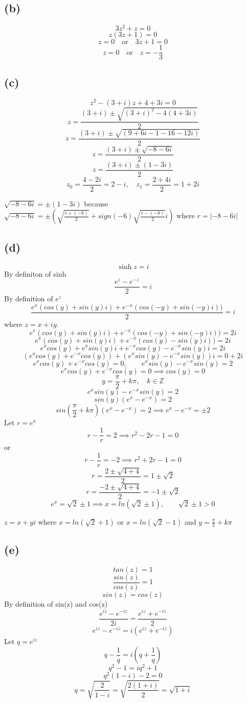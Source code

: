 \documentclass{article}
\begin{document}
\subsection*{(b)}
\[
   3z^2 + z = 0
\]
\[
   z(3z + 1) = 0
\]
\[
   z = 0 \quad \text{or} \quad 3z + 1 = 0
\]
\[
   z = 0 \quad \text{or} \quad z = -\frac{1}{3}
\]

\subsection*{(c)}
\[
   z^2 - (3 + i)z + 4 + 3i = 0
\]
\[
   z = \frac{(3 + i) \pm \sqrt{(3 + i)^2 - 4(4 + 3i)}}{2}
\]
\[
   z = \frac{(3 + i) \pm \sqrt{(9 + 6i - 1 - 16 - 12i)}}{2}
\]
\[
   z = \frac{(3 + i) \pm \sqrt{-8 - 6i}}{2}
\]
\[
   z = \frac{(3 + i) \pm (1 - 3i)}{2}
\]
\[
   z_0 = \frac{4 - 2i}{2} = 2 - i, \quad z_1 = \frac{2 + 4i}{2} = 1 + 2i
\]

\(\sqrt{-8 - 6i} = \pm (1 - 3i)\) because \(\sqrt{-8 - 6i} = \pm (\sqrt{\frac{r+(-8)}{2}} + sign(-6)\sqrt{\frac{r-(-8)}{2}}i)\) where \(r = |-8 -6i|\)

\subsection*{(d)}

\[
   \sinh z = i
\]
By definiton of sinh
\[
   \frac{e^z - e^{-z}}{2} = i
\]
By definition of \(e^z\)
\[
   \frac{e^x(cos(y) + sin(y)i) + e^{-x}(cos(-y) + sin(-y)i))}{2} = i
\]
where \(z = x + iy\).
\[
   e^x(cos(y) + sin(y)i) + e^{-x}(cos(-y) + sin(-y)i)) = 2i
\]
\[
   e^x(cos(y) + sin(y)i) + e^{-x}(cos(y) - sin(y)i)) = 2i
\]
\[
   e^x cos(y) + e^x sin(y)i + e^{-x} cos(y) - e^{-x} sin(y) i = 2i
\]
\[
   (e^x cos(y) + e^{-x} cos(y)) + (e^x sin(y) - e^{-x} sin(y)) i = 0 + 2i
\]
\[
   e^x cos(y) + e^{-x} cos(y) = 0, \qquad e^x sin(y) - e^{-x} sin(y) = 2
\]
\[
   e^x cos(y) + e^{-x} cos(y) = 0 \implies cos(y) = 0
\]
\[
   y = \frac{\pi}{2} + k\pi, \quad k \in \mathbb{Z}
\]
\[
   e^x sin(y) - e^{-x} sin(y) = 2
\]
\[
   sin(y)(e^x - e^{-x}) = 2
\]
\[
   sin(\frac{\pi}{2} + k \pi)(e^x - e^{-x}) = 2 \implies e^x - e^{-x} = \pm 2
\]
Let \(r = e^x\)
\[
   r - \frac{1}{r} = 2 \implies r^2 - 2r - 1 = 0
\]
or
\[
   r - \frac{1}{r} = -2 \implies r^2 + 2r - 1 = 0
\]
\[
   r = \frac{2 \pm \sqrt{4 + 4}}{2} = 1 \pm \sqrt{2}
\]
\[
   r = \frac{-2 \pm \sqrt{4 + 4}}{2} = -1 \pm \sqrt{2}
\]
\[
   e^x = \sqrt{2} \pm 1 \implies x = ln(\sqrt{2} \pm 1), \qquad \sqrt{2} \pm 1 > 0
\]

\(z = x+yi\) where \(x = ln(\sqrt{2} + 1)\) or \(x = ln(\sqrt{2} - 1)\) and \(y = \frac{\pi}{2} + k\pi\)

\subsection*{(e)}
\[
   tan(z) = 1
\]
\[
   \frac{sin(z)}{cos(z)} = 1
\]
\[
   sin(z) = cos(z)
\]
By definition of sin(z) and cos(z)
\[
   \frac{e^{iz} - e^{-iz}}{2i} = \frac{e^{iz} + e^{-iz}}{2}
\]
\[
   e^{iz} - e^{-iz} = i(e^{iz} + e^{-iz})
\]
Let \(q = e^{iz}\)
\[
   q - \frac{1}{q} = i(q + \frac{1}{q})
\]
\[
   q^2 - 1 = iq^2 + 1
\]
\[
   q^2(1-i) - 2 = 0
\]
\[
   q = \sqrt{\frac{2}{1-i}} = \sqrt{\frac{2(1+i)}{2}} = \sqrt{1 + i}
\]
\end{document}
